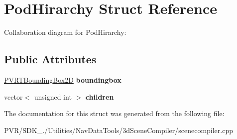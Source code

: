 \hypertarget{struct_pod_hirarchy}{\section{Pod\+Hirarchy Struct Reference}
\label{struct_pod_hirarchy}
}


Collaboration diagram for Pod\+Hirarchy\+:
\subsection*{Public Attributes}
\begin{DoxyCompactItemize}
\item 
\hypertarget{struct_pod_hirarchy_af5919cf9981086a160d469bcd2e5848c}{\hyperlink{structpvrnavigation_1_1_p_v_r_t_bounding_box2_d}{P\+V\+R\+T\+Bounding\+Box2\+D} {\bfseries boundingbox}}\label{struct_pod_hirarchy_af5919cf9981086a160d469bcd2e5848c}

\item 
\hypertarget{struct_pod_hirarchy_a7078d407cdc4f0c4991cf80c9b3b40c8}{vector$<$ unsigned int $>$ {\bfseries children}}\label{struct_pod_hirarchy_a7078d407cdc4f0c4991cf80c9b3b40c8}

\end{DoxyCompactItemize}


The documentation for this struct was generated from the following file\+:\begin{DoxyCompactItemize}
\item 
P\+V\+R/\+S\+D\+K\+\_./\+Utilities/\+Nav\+Data\+Tools/3d\+Scene\+Compiler/scenecompiler.\+cpp\end{DoxyCompactItemize}
